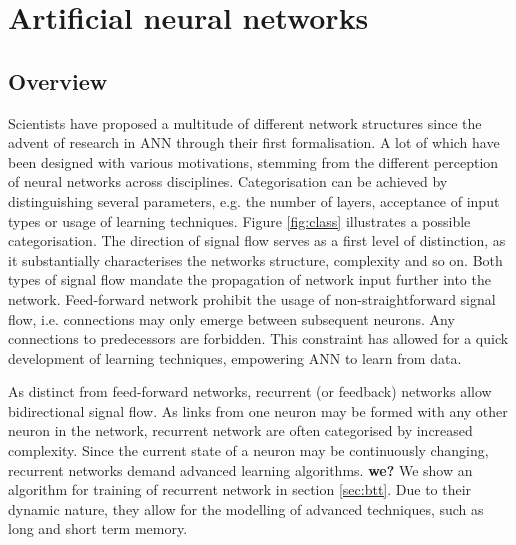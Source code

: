 \documentclass[10pt,a4paper,DIV=11]{scrreprt}
\begin{document}
\chapter{Artificial neural networks}
\section{Overview}

Scientists have proposed a multitude of different network structures since the advent of research in ANN through their first formalisation. 
A lot of which have been designed with various motivations, stemming from the different perception of neural networks across disciplines.
Categorisation can be achieved by distinguishing several parameters, e.g. the number of layers, acceptance of input types or usage of learning techniques.
Figure \ref{fig:class} illustrates a possible categorisation\cite{NNGER}.
The direction of signal flow serves as a first level of distinction, as it substantially characterises the networks structure, complexity and so on.
Both types of signal flow mandate the propagation of network input further into the network.
Feed-forward network prohibit the usage of non-straightforward signal flow, i.e. connections may only emerge between subsequent neurons.
Any connections to predecessors are forbidden. This constraint has allowed for a quick development of learning techniques, empowering ANN to learn from data. 

As distinct from feed-forward networks, recurrent (or feedback) networks allow bidirectional signal flow. 
As links from one neuron may be formed with any other neuron in the network, recurrent network are often categorised by increased complexity.
Since the current state of a neuron may be continuously changing, recurrent networks demand advanced learning algorithms. \textbf{we?} We show an algorithm for training of recurrent network in section \ref{sec:btt}.
Due to their dynamic nature, they allow for the modelling of advanced techniques, such as long and short term memory.
\end{document}
